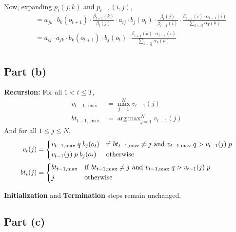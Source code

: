 \documentclass[11pt,a4paper,titlepage]{article}
\DeclareMathOperator*{\argmax}{arg\,max} %
\begin{document}
Now, expanding $p_t(j, k)$ and $p_{t-1}(i, j)$,
\begin{align*}
    ~~ &= a_{jk} \cdot b_k(o_{t+1}) \cdot \frac{\beta_{t+1}(k)}{\beta_t(j)} \cdot
          a_{ij} \cdot b_j(o_t) \cdot \frac{\beta_t(j)}{\beta_{t-1}(i)} \cdot
          \frac{\beta_{t-1}(i) \cdot \alpha_{t-1}(i)}{\sum_{h \in Q}\alpha_T(h)} \\
       &= a_{ij} \cdot a_{jk} \cdot b_k(o_{t+1}) \cdot b_j(o_t) \cdot
          \frac{\beta_{t+1}(k) \cdot \alpha_{t-1}(i)}{\sum_{h \in Q}\alpha_T(h)} \\
\end{align*}

\subsection*{Part (b)}

\textbf{Recursion:} For all $1 < t \le T$,
\begin{align*}
    v_{t-1, \max} &= \max_{j=1}^N v_{t-1}(j) \\
    bt_{t-1, \max} &= \argmax_{j=1}^N v_{t-1}(j) %
\end{align*}
And for all $1 \le j \le N$,
\begin{align*}
    v_t(j) &=
    \begin{dcases}
        v_{t-1, \max} \; q \; b_j(o_t)
            & {\rm if~} bt_{t-1, \max} \ne j {\rm~and~} v_{t-1, \max} \; q > v_{t-1}(j) \; p \\
        v_{t-1}(j) \; p \; b_j(o_t)
            & \textrm{otherwise}
    \end{dcases} \\
    bt_t(j) &=
    \begin{dcases}
        bt_{t-1,\max}
            & {\rm if~} bt_{t-1, \max} \ne j {\rm~and~} v_{t-1, \max} \; q > v_{t-1}(j) \; p \\
        j
            & \textrm{otherwise}
    \end{dcases}
\end{align*}

\noindent \textbf{Initialization} and \textbf{Termination} steps remain unchanged.

\subsection*{Part (c)}
\end{document}
